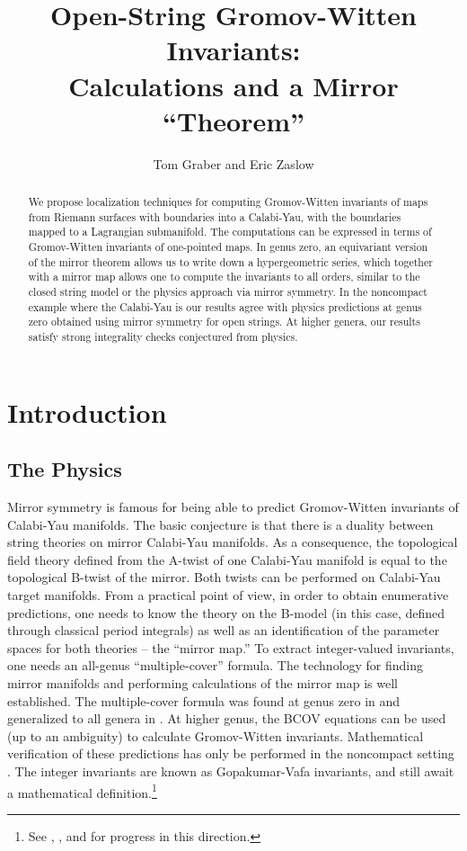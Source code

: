 \documentclass[a4paper,11pt]{article}
\providecommand{\PP}{{\mathbb{P}}}
\begin{document}
\title{Open-String Gromov-Witten Invariants:\\
Calculations and a Mirror ``Theorem''}
\author{Tom Graber and Eric Zaslow}
\maketitle

\begin{abstract}
We propose localization techniques
for computing Gromov-Witten invariants
of maps from Riemann surfaces with
boundaries into a Calabi-Yau,
with the boundaries mapped to a Lagrangian submanifold.
The computations can be expressed in terms of
Gromov-Witten invariants of one-pointed maps.
In genus zero,
an equivariant version of the mirror theorem
allows us to write down a hypergeometric
series, which together with a mirror map allows
one to compute the invariants to all orders,
similar to the closed string model or the physics
approach via mirror symmetry.
In the noncompact example where the
Calabi-Yau is \myHighlight{$K_{\PP^2},$}\coordHE{}
our results agree with physics predictions
at genus zero obtained using
mirror symmetry for open strings.
At higher genera, our results satisfy strong
integrality checks conjectured from physics. 
\end{abstract}


\section{Introduction}

\subsection{The Physics}

Mirror symmetry is famous
for being able to predict Gromov-Witten
invariants of Calabi-Yau manifolds.  The basic
conjecture is that there is a duality
between string theories on mirror Calabi-Yau
manifolds.  As a consequence,
the topological field theory defined
from the A-twist of one Calabi-Yau manifold is equal
to the topological B-twist of the mirror.  Both twists
can be performed on Calabi-Yau target manifolds.
From a practical point of view, in order to obtain enumerative
predictions, one needs to know the theory on the B-model
(in this case, defined through classical period integrals)
as well as an identification of the parameter spaces
for both theories -- the ``mirror map.''  To extract
integer-valued invariants, one needs an all-genus
``multiple-cover'' formula.
The technology for finding mirror manifolds \cite{Batyrev} and
performing calculations of the mirror map \cite{HKTY}
is well established.  The multiple-cover formula was
found at genus zero in \cite{CDGP} and generalized to
all genera in \cite{GV}.  At higher genus, the BCOV equations
\cite{BCOV} can be used (up to an ambiguity) to calculate Gromov-Witten
invariants.  Mathematical verification of these predictions
has only be performed in the noncompact setting
\cite{Hosono1} \cite{KZ}.
The integer invariants
are known as Gopakumar-Vafa invariants, and still await
a mathematical definition.\footnote{See \cite{BP}, \cite{KKV},
and \cite{Hosono2} for progress in this direction.}
\end{document}
